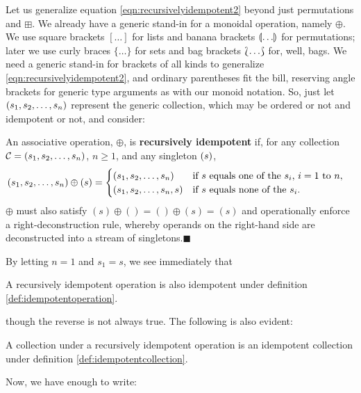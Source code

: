 Let us generalize equation \ref{eqn:recursivelyidempotent2} beyond just permutations and $\boxplus$. We already have a generic stand-in for a monoidal operation, namely $\oplus$. We use square brackets $[\ldots]$ for lists and banana brackets $\llparenthesis\ldots\rrparenthesis$ for permutations; later we use curly braces $\{\ldots\}$ for sets and bag brackets $\Lbag\ldots\Rbag$ for, well, bags. We need a generic stand-in for brackets of all kinds to generalize \ref{eqn:recursivelyidempotent2}, and ordinary parentheses fit the bill, reserving angle brackets for generic type arguments as with our monoid notation. So, just let $\left( s_1, s_2, \ldots, s_n\right)$ represent the generic collection, which may be ordered or not and idempotent or not, and consider:
\begin{definition}
  An associative operation, $\oplus$, is \textbf{recursively idempotent} if, for any collection \linebreak $\mathcal{C}=\left( s_1, s_2, \ldots, s_n\right)$, $n\ge 1$, and any singleton $\left( s\right)$,
\begin{align*}
  \left( s_1, s_2, \ldots, s_n\right)  \oplus \left( s\right) &=
  \begin{cases}
    \left( s_1, s_2, \ldots, s_n\right) &
      \text{if $s$ equals one of the $s_i$, $i=1$ to $n$},\\
    \left( s_1, s_2, \ldots, s_n, s\right) &
      \text{if $s$ equals none of the $s_i$}.
  \end{cases}
\end{align*}
$\oplus$ must also satisfy $(s)\oplus()=()\oplus(s)=(s)$ and operationally enforce a right-deconstruction rule, whereby operands on the right-hand side are deconstructed into a stream of singletons.$\blacksquare$
\label{def:recursivelyidempotent}
\end{definition}


By letting $n=1$ and $s_1 = s$, we see immediately that
\begin{lemma}
  A recursively idempotent operation is also idempotent under definition \ref{def:idempotentoperation}.
\end{lemma}
though the reverse is not always true. The following is also evident:
\begin{lemma}
  A collection under a recursively idempotent operation is an idempotent collection under definition \ref{def:idempotentcollection}.
\end{lemma}
Now, we have enough to write:


